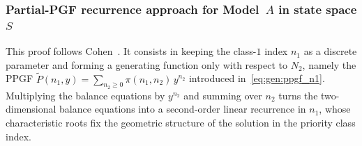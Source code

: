 \subsubsection{Partial-PGF recurrence approach for Model~\texorpdfstring{$A$}{A} in state space \texorpdfstring{$S$}{S}}


This proof follows Cohen~\cite{cohen1956delay}. It consists in keeping the class-$1$
index $n_1$ as a discrete parameter and forming a generating function only with respect
to $N_2$, namely the PPGF $\widetilde{P}(n_1,y)=\sum_{n_2\geq0}\pi(n_1,n_2)\,y^{n_2}$
introduced in~\eqref{eq:gen:ppgf_n1}. Multiplying the balance equations by $y^{n_2}$ and
summing over $n_2$ turns the two-dimensional balance equations into a second-order linear
recurrence in $n_1$, whose characteristic roots fix the geometric structure of the
solution in the priority class index.

